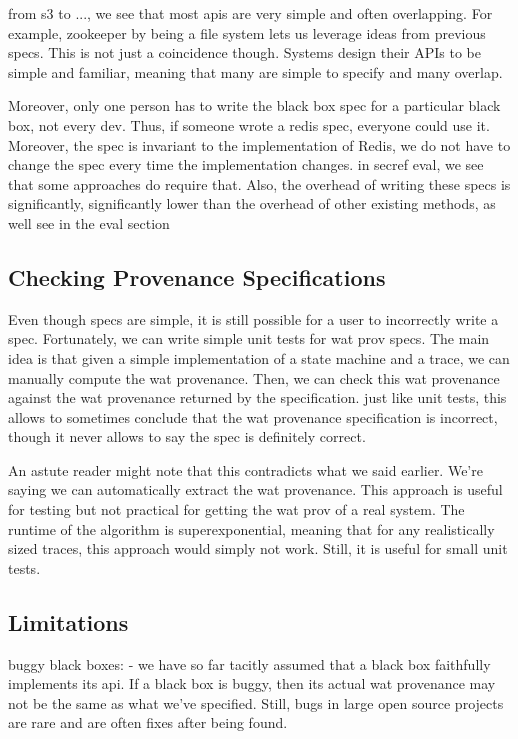 from s3 to ..., we see that most apis are very simple and often overlapping. For example, zookeeper by being a file system lets us leverage ideas from previous specs. This is not just a coincidence though. Systems design their APIs to be simple and familiar, meaning that many are simple to specify and many overlap.

Moreover, only one person has to write the black box spec for a particular black box, not every dev. Thus, if someone wrote a redis spec, everyone could use it. Moreover, the spec is invariant to the implementation of Redis, we do not have to change the spec every time the implementation changes. in secref eval, we see that some approaches do require that. Also, the overhead of writing these specs is significantly, significantly lower than the overhead of other existing methods, as well see in the eval section

\subsection{Checking Provenance Specifications}
Even though specs are simple, it is still possible for a user to incorrectly write a spec. Fortunately, we can write simple unit tests for wat prov specs. The main idea is that given a simple implementation of a state machine and a trace, we can manually compute the wat provenance. Then, we can check this wat provenance against the wat provenance returned by the specification. just like unit tests, this allows to sometimes conclude that the wat provenance specification is incorrect, though it never allows to say the spec is definitely correct.

An astute reader might note that this contradicts what we said earlier. We're saying we can automatically extract the wat provenance. This approach is useful for testing but not practical for getting the wat prov of a real system. The runtime of the algorithm is superexponential, meaning that for any realistically sized traces, this approach would simply not work. Still, it is useful for small unit tests.

\subsection{Limitations}
buggy black boxes:
  - we have so far tacitly assumed that a black box faithfully implements its api. If a black box is buggy, then its actual wat provenance may not be the same as what we've specified. Still, bugs in large open source projects are rare and are often fixes after being found.

